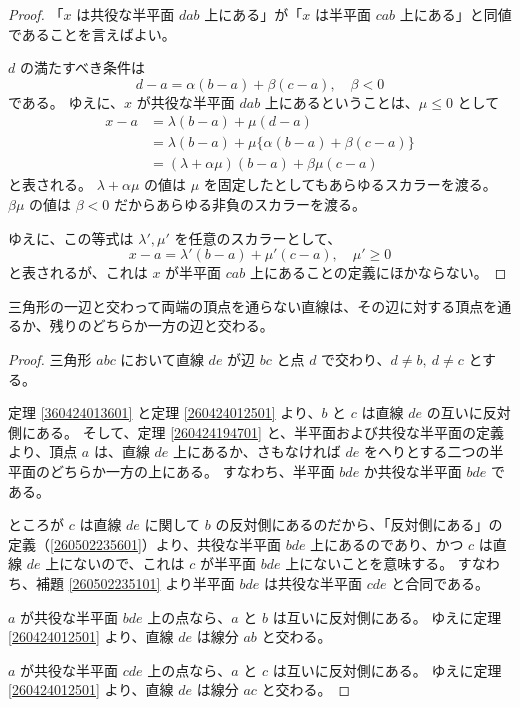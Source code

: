\begin{proof}
  「\(x\) は共役な半平面 \(dab\) 上にある」が「\(x\) は半平面 \(cab\) 上にある」と同値であることを言えばよい。

  \(d\) の満たすべき条件は
  \[d-a=\alpha(b-a)+\beta(c-a),\quad \beta<0\]
  である。
  ゆえに、\(x\) が共役な半平面 \(dab\) 上にあるということは、\(\mu\leq 0\) として
  \begin{align*}
    x-a &=\lambda(b-a)+\mu(d-a) \\
        &=\lambda(b-a)+\mu\{\alpha(b-a)+\beta(c-a)\} \\
        &=(\lambda+\alpha\mu)(b-a)+\beta\mu(c-a)
  \end{align*}
  と表される。
  \(\lambda+\alpha\mu\) の値は \(\mu\) を固定したとしてもあらゆるスカラーを渡る。
  \(\beta\mu\) の値は \(\beta<0\) だからあらゆる非負のスカラーを渡る。

  ゆえに、この等式は \(\lambda',\mu'\) を任意のスカラーとして、
  \[x-a=\lambda'(b-a)+\mu'(c-a),\quad \mu'\geq 0\]
  と表されるが、これは \(x\) が半平面 \(cab\) 上にあることの定義にほかならない。
\end{proof}


\begin{thm}
  三角形の一辺と交わって両端の頂点を通らない直線は、その辺に対する頂点を通るか、残りのどちらか一方の辺と交わる。
\end{thm}

\begin{proof}
  三角形 \(abc\) において直線 \(de\) が辺 \(bc\) と点 \(d\) で交わり、\(d\neq b,\ d\neq c\) とする。

  定理 \ref{360424013601} と定理 \ref{260424012501} より、\(b\) と \(c\) は直線 \(de\) の互いに反対側にある。
  そして、定理 \ref{260424194701} と、半平面および共役な半平面の定義より、頂点 \(a\) は、直線 \(de\) 上にあるか、さもなければ \(de\) をへりとする二つの半平面のどちらか一方の上にある。
  すなわち、半平面 \(bde\) か共役な半平面 \(bde\) である。

  ところが \(c\) は直線 \(de\) に関して \(b\) の反対側にあるのだから、「反対側にある」の定義（\ref{260502235601}）より、共役な半平面 \(bde\) 上にあるのであり、かつ \(c\) は直線 \(de\) 上にないので、これは \(c\) が半平面 \(bde\) 上にないことを意味する。
  すなわち、補題 \ref{260502235101} より半平面 \(bde\) は共役な半平面 \(cde\) と合同である。

  \(a\) が共役な半平面 \(bde\) 上の点なら、\(a\) と \(b\) は互いに反対側にある。
  ゆえに定理 \ref{260424012501} より、直線 \(de\) は線分 \(ab\) と交わる。

  \(a\) が共役な半平面 \(cde\) 上の点なら、\(a\) と \(c\) は互いに反対側にある。
  ゆえに定理 \ref{260424012501} より、直線 \(de\) は線分 \(ac\) と交わる。
\end{proof}

